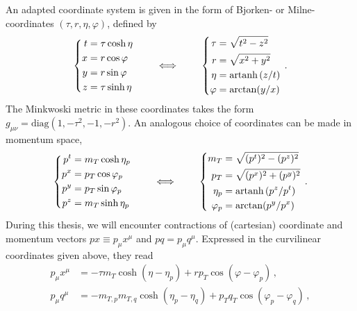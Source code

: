 An adapted coordinate system is given in the form of Bjorken- or Milne-coordinates ${(\tau, r, \eta, \varphi)}$, defined by
\begin{equation}
    \left\{\begin{split}
        t&=\tau\cosh\eta\\
        x&=r\cos\varphi\\
        y&=r\sin\varphi\\
        z&=\tau\sinh\eta
    \end{split}\right.
    \qquad\iff\qquad
    \left\{\begin{split}
        \tau&=\sqrt{t^2-z^2}\\
        r&=\sqrt{x^2+y^2}\\
        \eta&={\text{artanh}\,}(z/t)\\
        \varphi&=\arctan(y/x)
    \end{split}\right.\,.
    \label{eq:BjorkenCoords_PositionSpace}
\end{equation}
The Minkwoski metric in these coordinates takes the form ${g_{\mu\nu}=\text{diag}(1,-\tau^2,-1,-r^2)}$. An analogous choice of coordinates can be made in momentum space,
\begin{equation}
    \left\{
    \begin{split}
        p^t&=m_T\cosh\eta_p\\
        p^x&=p_T\cos\varphi_p\\
        p^y&=p_T\sin\varphi_p\\
        p^z&=m_T\sinh\eta_p
    \end{split}
    \right.\qquad\iff\qquad
    \left\{
    \begin{split}
        m_T&=\sqrt{(p^t)^2-(p^z)^2}\\
        p_T&=\sqrt{(p^x)^2+(p^y)^2}\\
        \eta_p&={\text{artanh}\,}(p^z/p^t)\\
        \varphi_p&=\arctan(p^y/p^x)
    \end{split}
    \right.\,.
    \label{eq:BjorkenCoords_MomentumSpace}
\end{equation}
During this thesis, we will encounter contractions of (cartesian) coordinate and momentum vectors ${px\equiv p_\mu x^\mu}$ and ${pq=p_\mu q^\mu}$. Expressed in the curvilinear coordinates given above, they read
\begin{subequations}
    \begin{align}
        p_\mu x^\mu&=-\tau m_T\cosh(\eta-\eta_p)+rp_T\cos(\varphi-\varphi_p)\,,\label{eq:px_contraction}\\
        p_\mu q^\mu&=-m_{T,p}m_{T,q}\cosh(\eta_p-\eta_q)+p_Tq_T\cos(\varphi_p-\varphi_q)\,,\label{eq:pq_contraction}
    \end{align}
    \label{eq:pxpq_contractions}
\end{subequations}
